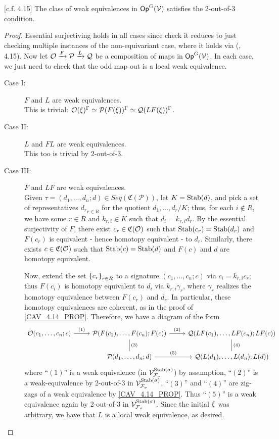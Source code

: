 \documentclass[psamsfonts,onesided,10pt,letterpaper]{amsart}%
\renewcommand{\C}{\ensuremath{\mathfrak{C}}}
\renewcommand{\F}{\mathcal F}
\renewcommand{\1}{\ensuremath{\mathbb{id}}}
\renewcommand{\P}{\ensuremath{\mathcal{P}}}
\newcommand{\Q}{\ensuremath{\mathcal{Q}}}
\newcommand{\Vsigma}{\ensuremath{\V^{\Stab(\sigma)}_{\F_\sigma}}}
\begin{document}
\begin{proposition}
  \label{CAV_4.15_PROP}
  [c.f. \cite{Cav14} 4.15]
  The class of weak equivalences in $\mathsf{Op}^G(\mathcal V)$ satisfies the 2-out-of-3 condition.
\end{proposition}
\begin{proof}
  Essential surjectiving holds in all cases since check it reduces to just checking multiple instances of the non-equivariant case, where it holds via (\cite{Cav14}, 4.15). Now let $\O \xrightarrow{F} \P \xrightarrow{L} \Q$ be a composition of maps in $\mathsf{Op}^G(\mathcal V)$. In each case, we just need to check that the odd map out is a local weak equivalence.
  \begin{description}
  \item[Case I:] $F$ and $L$ are weak equivalences.\\
    This is trivial: $\O(\ksi)^\Gamma \simeq \P(F(\ksi))^\Gamma \simeq \Q(LF(\ksi))^\Gamma$.
  \item[Case II:] $L$ and $FL$ are weak equivalences.\\
    This too is trivial by 2-out-of-3. 
  \item[Case III:] $F$ and $LF$ are weak equivalences.\\
    Given $\tau = (d_1,\ldots,d_n;d)\in Seq(\C(\P))$, let $K = \mathrm{Stab}(d)$, and pick a set of representatives ${d_r}_{r\in R}$ for the quotient ${d_1,\ldots, d_r}/K$; thus, for each $i\not\in R$, we have some $r\in R$ and $k_{r,i}\in K$ such that $d_i = k_{r,i}d_r$. By the essential surjectivity of $F$, there exist $c_r\in \C(\O)$ such that $\mathrm{Stab}(c_r) = \mathrm{Stab}(d_r)$ and $F(c_r)$ is equivalent - hence homotopy equivalent - to $d_r$. Similarly, there exists $c\in \C(\O)$ such that $\mathrm{Stab}(c) = \mathrm{Stab}(d)$ and $F(c)$ and $d$ are homotopy equivalent. 

Now, extend the set $\left\{c_r\right\}_{r\in R}$ to a signature $(c_1,\ldots, c_n;c)$ via $c_i = k_{r,i}c_r$; thus $F(c_i)$ is homotopy equivalent to $d_i$ via $k_{r,i}\gamma_r$, where $\gamma_r$ realizes the homotopy equivalence between $F(c_r)$ and $d_r$. In particular, these homotopy equivalences are coherent, as in the proof of \ref{CAV_4.14_PROP}. Therefore, we have a diagram of the form
\[
\begin{tikzcd}
  \O(c_1,\ldots, c_n;c) \arrow[r, "(1)"] & \P(F(c_1),\ldots, F(c_n); F(c)) \arrow[d,dash, "(3)"] \arrow[r, "(2)"] & \Q(LF(c_1),\ldots, LF(c_n);LF(c)) \arrow[d, dash, "(4)"] \\
  & \P(d_1,\ldots, d_n;d) \arrow[r, "(5)"] & \Q(L(d_1),\ldots, L(d_n); L(d))
\end{tikzcd}
\]
where ``$(1)$'' is a weak equivalence (in $\Vsigma$) by assumption, ``$(2)$'' is a weak-equivalence by 2-out-of-3 in $\Vsigma$, ``$(3)$'' and ``$(4)$'' are zig-zags of a weak equivalence by \ref{CAV_4.14_PROP}. Thus ``$(5)$'' is a weak equivalence again by 2-out-of-3 in $\Vsigma$. Since the initial $\xi$ was arbitrary, we have that $L$ is a local weak equivalence, as desired.
  \end{description}
\end{proof}
\end{document}
